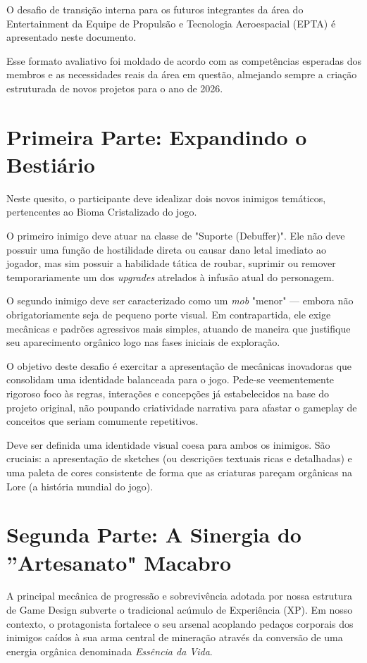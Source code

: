 \documentclass[a4paper, 12pt,  oneside,a4paper,english,french,spanish,brazil]{book}     %
\begin{document}
O desafio de transição interna para os futuros integrantes da área do Entertainment da Equipe de Propulsão e Tecnologia Aeroespacial (EPTA) é apresentado neste documento.

Esse formato avaliativo foi moldado de acordo com as competências esperadas dos membros e as necessidades reais da área em questão, almejando sempre a criação estruturada de novos projetos para o ano de 2026.

\section*{Primeira Parte: Expandindo o Bestiário}

Neste quesito, o participante deve idealizar dois novos inimigos temáticos, pertencentes ao Bioma Cristalizado do jogo. 

O primeiro inimigo deve atuar na classe de "Suporte (Debuffer)". Ele não deve possuir uma função de hostilidade direta ou causar dano letal imediato ao jogador, mas sim possuir a habilidade tática de roubar, suprimir ou remover temporariamente um dos \textit{upgrades} atrelados à infusão atual do personagem. 

O segundo inimigo deve ser caracterizado como um \textit{mob} "menor" --- embora não obrigatoriamente seja de pequeno porte visual. Em contrapartida, ele exige mecânicas e padrões agressivos mais simples, atuando de maneira que justifique seu aparecimento orgânico logo nas fases iniciais de exploração.

O objetivo deste desafio é exercitar a apresentação de mecânicas inovadoras que consolidam uma identidade balanceada para o jogo. Pede-se veementemente rigoroso foco às regras, interações e concepções já estabelecidos na base do projeto original, não poupando criatividade narrativa para afastar o gameplay de conceitos que seriam comumente repetitivos. 

Deve ser definida uma identidade visual coesa para ambos os inimigos. São cruciais: a apresentação de sketches (ou descrições textuais ricas e detalhadas) e uma paleta de cores consistente de forma que as criaturas pareçam orgânicas na Lore (a história mundial do jogo).

\section*{Segunda Parte: A Sinergia do ''Artesanato" Macabro}

A principal mecânica de progressão e sobrevivência adotada por nossa estrutura de Game Design subverte o tradicional acúmulo de Experiência (XP). Em nosso contexto, o protagonista fortalece o seu arsenal acoplando pedaços corporais dos inimigos caídos à sua arma central de mineração através da conversão de uma energia orgânica denominada \textit{Essência da Vida}.
\end{document}
